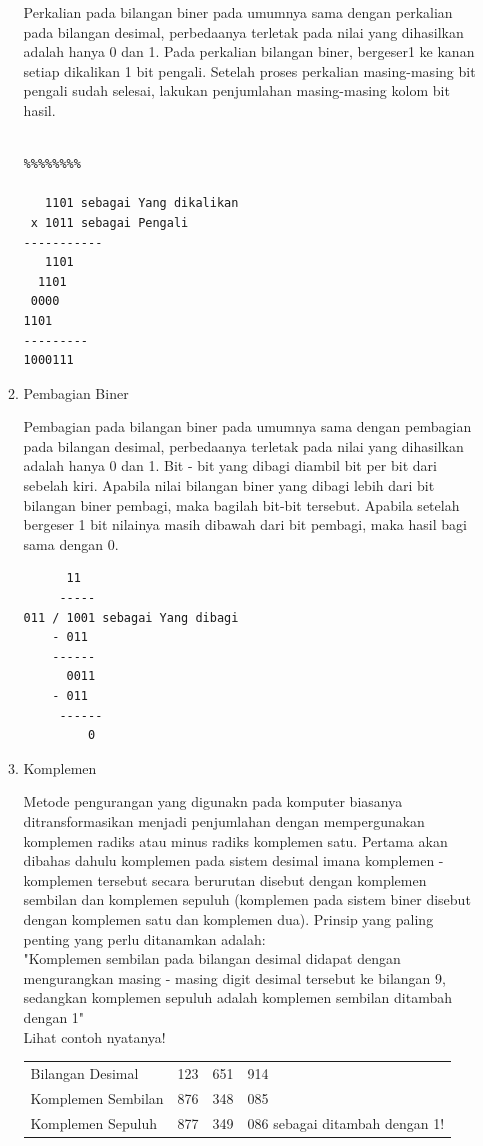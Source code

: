 \begin{enumerate}[label=(\alph*)]
\begin{enumerate}
\qquad Perkalian pada bilangan biner pada umumnya sama dengan perkalian pada bilangan desimal, perbedaanya terletak pada nilai yang dihasilkan adalah hanya 0 dan 1. Pada perkalian bilangan biner, bergeser1 ke kanan setiap dikalikan 1 bit pengali. Setelah proses perkalian masing-masing bit pengali sudah selesai, lakukan penjumlahan masing-masing kolom bit hasil.
\begin{verbatim}

%%%%%%%%

   1101 sebagai Yang dikalikan
 x 1011 sebagai Pengali
-----------
   1101
  1101
 0000
1101
---------
1000111
\end{verbatim}


\item Pembagian Biner

\qquad Pembagian pada bilangan biner pada umumnya sama dengan pembagian pada bilangan desimal, perbedaanya terletak pada nilai yang dihasilkan  adalah hanya 0 dan 1. Bit - bit yang dibagi diambil bit per bit dari sebelah kiri. Apabila nilai bilangan biner yang dibagi lebih dari bit bilangan biner pembagi, maka bagilah bit-bit tersebut. Apabila setelah bergeser 1 bit nilainya masih dibawah dari bit pembagi, maka hasil bagi sama dengan 0.
\begin{verbatim}
      11
     -----
011 / 1001 sebagai Yang dibagi
    - 011
    ------
      0011
    - 011
     ------
         0
\end{verbatim}


\item Komplemen

\qquad Metode pengurangan yang digunakn pada komputer biasanya ditransformasikan menjadi penjumlahan dengan mempergunakan komplemen radiks atau minus radiks komplemen satu. Pertama akan dibahas dahulu komplemen pada sistem desimal imana komplemen - komplemen tersebut secara berurutan disebut dengan komplemen sembilan dan komplemen sepuluh (komplemen pada sistem biner disebut dengan komplemen satu dan komplemen dua). Prinsip yang paling penting yang perlu ditanamkan adalah: \\

\qquad "Komplemen sembilan pada bilangan desimal didapat dengan mengurangkan masing - masing digit desimal tersebut ke bilangan 9, sedangkan komplemen sepuluh adalah komplemen sembilan ditambah dengan 1" \\
Lihat contoh nyatanya!\\

\begin{tabular}{ l l l l }
Bilangan Desimal & 123 & 651 & 914 \\
Komplemen Sembilan &876 &348 &085 \\
Komplemen Sepuluh &877 &349 &086 sebagai ditambah dengan 1! \\
\end{tabular}\\


\end{enumerate}
\end{enumerate}
